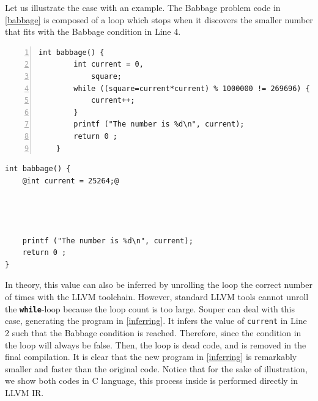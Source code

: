 Let us illustrate the case with an example.
The Babbage problem code in \autoref{babbage} is composed of a loop which stops when it discovers the smaller number that fits with the Babbage condition in Line 4.


{


\begin{minipage}[t]{0.5\linewidth}
    \begin{lstlisting}[numbers=left]
    int babbage() {
        int current = 0,
            square;
        while ((square=current*current) % 1000000 != 269696) {
            current++;
        }
        printf ("The number is %d\n", current);
        return 0 ;
    }
    \end{lstlisting}
\end{minipage}
\begin{minipage}[t]{0.5\linewidth}
    \begin{lstlisting}[]
int babbage() {
    @int current = 25264;@
    
    


    printf ("The number is %d\n", current);
    return 0 ;
}
    \end{lstlisting}
\end{minipage}
}
In theory, this value can also be inferred by unrolling the loop the correct number of times with the LLVM toolchain.
However, standard LLVM tools cannot unroll the \texttt{\textbf{while}}-loop because the loop count is too large.
Souper can deal with this case, generating the program in \autoref{inferring}. It infers the value of \texttt{current} in Line 2 such that the Babbage condition is reached. Therefore, since the condition in the loop will always be false. Then, the loop is dead code, and is removed in the final compilation. It is clear that the new program in \autoref{inferring} is remarkably smaller and faster than the original code. Notice that for the sake of illustration, we show both codes in C language, this process inside is performed directly in LLVM IR.

